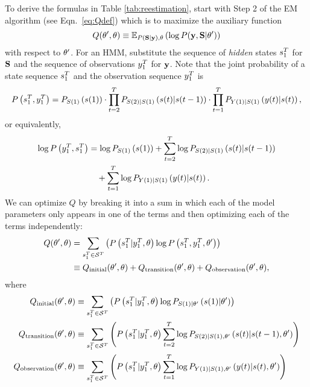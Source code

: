 To derive the formulas in Table \ref{tab:reestimation}, start with
Step 2 of the EM algorithm (see Eqn.~\eqref{eq:Qdef}) which is to
maximize the auxiliary function
\begin{equation*}
  Q(\theta',\theta) \equiv \mathbb{E}_{P \left({\bf S}|\mathbf{y} \right),\theta}
  \left( \log P(\mathbf{y},{\bf S}|\theta') \right)
\end{equation*}
with respect to $\theta'$.  For an HMM, substitute the sequence of
\emph{hidden} states $s_{1}^{T}$ for ${\bf S}$ and the sequence of
observations $y_{1}^{T}$ for $\mathbf{y}$.  Note that the joint probability
of a state sequence $s_{1}^{T}$ and the observation sequence
$y_{1}^{T}$ is
\begin{equation*}
  P\left( s_{1}^{T},y_{1}^{T} \right) = P_{{S}{(1)}}
  \left({s}{(1)} \right) \cdot \prod_{t=2}^T P_{{S}{(2)}|{S}{(1)}}
  \left({s}{(t)}|{s}{(t-1)} \right)
  \cdot \prod_{t=1}^T  P_{{Y}{(1)}|{S}{(1)}}
  \left({y}{(t)}|{s}{(t)} \right),
\end{equation*}
or equivalently,
\begin{align*}
  \log P\left(y_{1}^{T}, s_{1}^{T} \right) &= \log P_{{S}{(1)}}
  \left({s}{(1)} \right) + \sum_{t=2}^T \log P_{{S}{(2)}|{S}{(1)}}
  \left({s}{(t)}|{s}{(t-1)} \right)\\
  &\quad + \sum_{t=1}^T \log  P_{{Y}{(1)}|{S}{(1)}}
  \left({y}{(t)}|{s}{(t)} \right).
\end{align*}
We can optimize $Q$ by breaking it into a sum in which each of the
model parameters only appears in one of the terms and then optimizing
each of the terms independently:
\begin{align}
  \label{eq:QHMM}
  Q(\parameters',\parameters) &= \sum_{\ts{s}{1}{T}\in\states^T}
  \left( P
  \left(\ts{s}{1}{T}|\ts{y}{1}{T},\parameters \right) \log P
  \left(\ts{s}{1}{T},\ts{y}{1}{T},\parameters' \right) \right) \\
  \label{eq:QHMMseparate}
  & \equiv Q_{\text{initial}} (\parameters',\parameters) +
  Q_{\text{transition}} (\parameters',\parameters) + Q_{\text{observation}}
  (\parameters',\parameters),
\end{align}
where
\begin{align}
  \label{eq:Qinitial}
  Q_{\text{initial}} (\parameters',\parameters) &\equiv
%
  \sum_{\ts{s}{1}{T}\in\states^T} \left( P
  \left(\ts{s}{1}{T}|\ts{y}{1}{T},\parameters \right) \log P_{\ti{S}{1}|\parameters'}
  \left(\ti{s}{1}|\parameters' \right) \right)\\
%
  \label{eq:Qtransition}
  Q_{\text{transition}} (\parameters',\parameters) &\equiv
%
  \sum_{\ts{s}{1}{T}\in\states^T} \left( P
  \left(\ts{s}{1}{T}|\ts{y}{1}{T},\parameters \right) \sum_{t=2}^T \log
  P_{\ti{S}{2}|\ti{S}{1},\parameters'}
  \left(\ti{s}{t}|\ti{s}{t-1},\parameters' \right) \right) \\
%
  \label{eq:Qoutput}
  Q_{\text{observation}} (\parameters',\parameters) &\equiv
%
  \sum_{\ts{s}{1}{T}\in\states^T} \left( P
  \left(\ts{s}{1}{T}|\ts{y}{1}{T},\parameters \right) \sum_{t=1}^T \log
  P_{\ti{Y}{1}|\ti{S}{1},\parameters'}
  \left(\ti{y}{t}|\ti{s}{t},\parameters' \right) \right)
%
\end{align}

